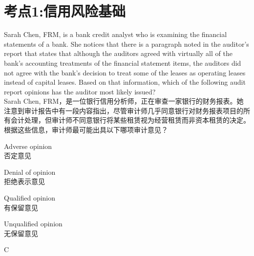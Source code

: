 \documentclass{article}
\newcounter{question} %
\begin{document}
 \tableofcontents %
\newpage




\section{考点1:信用风险基础}
\setcounter{question}{0}


\begin{question}
    Sarah Chen, FRM, is a bank credit analyst who is examining the financial statements of a bank. She notices that there is a paragraph noted in the auditor's report that states that although the auditors agreed with virtually all of the bank's accounting treatments of the financial statement items, the auditors did not agree with the bank's decision to treat some of the leases as operating leases instead of capital leases. Based on that information, which of the following audit report opinions has the auditor most likely issued?
    \\ Sarah Chen, FRM，是一位银行信用分析师，正在审查一家银行的财务报表。她注意到审计报告中有一段内容指出，尽管审计师几乎同意银行对财务报表项目的所有会计处理，但审计师不同意银行将某些租赁视为经营租赁而非资本租赁的决定。根据这些信息，审计师最可能出具以下哪项审计意见？
\end{question}

\begin{choices}
    \item Adverse opinion\\
    否定意见
    \item Denial of opinion\\
    拒绝表示意见
    \item Qualified opinion\\
    有保留意见
    \item Unqualified opinion\\
    无保留意见
\end{choices}

\begin{correctanswer}
    C
\end{correctanswer}
\end{document}
